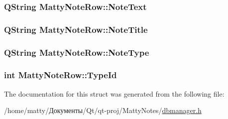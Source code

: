 \subsubsection[{\texorpdfstring{Note\+Text}{NoteText}}]{\setlength{\rightskip}{0pt plus 5cm}Q\+String Matty\+Note\+Row\+::\+Note\+Text}\hypertarget{struct_matty_note_row_a0d52bdab09c2d327d3cd87b25dd3183b}{}\label{struct_matty_note_row_a0d52bdab09c2d327d3cd87b25dd3183b}
\subsubsection[{\texorpdfstring{Note\+Title}{NoteTitle}}]{\setlength{\rightskip}{0pt plus 5cm}Q\+String Matty\+Note\+Row\+::\+Note\+Title}\hypertarget{struct_matty_note_row_ab9c1d123c0e7caabfe6291b87b13628b}{}\label{struct_matty_note_row_ab9c1d123c0e7caabfe6291b87b13628b}
\subsubsection[{\texorpdfstring{Note\+Type}{NoteType}}]{\setlength{\rightskip}{0pt plus 5cm}Q\+String Matty\+Note\+Row\+::\+Note\+Type}\hypertarget{struct_matty_note_row_a429bf85e7d1ef676e6dde1ca42d79313}{}\label{struct_matty_note_row_a429bf85e7d1ef676e6dde1ca42d79313}
\subsubsection[{\texorpdfstring{Type\+Id}{TypeId}}]{\setlength{\rightskip}{0pt plus 5cm}int Matty\+Note\+Row\+::\+Type\+Id}\hypertarget{struct_matty_note_row_a5720bf28d6c35044d52ad8a098004259}{}\label{struct_matty_note_row_a5720bf28d6c35044d52ad8a098004259}


The documentation for this struct was generated from the following file\+:\begin{DoxyCompactItemize}
\item 
/home/matty/Документы/\+Qt/qt-\/proj/\+Matty\+Notes/\hyperlink{dbmanager_8h}{dbmanager.\+h}\end{DoxyCompactItemize}
